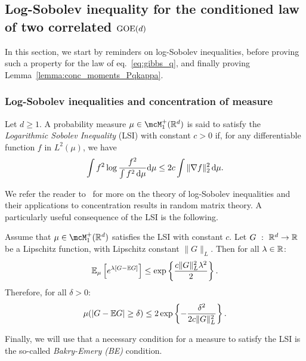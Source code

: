 \subsection{Log-Sobolev inequality for the conditioned law of two correlated \texorpdfstring{$\mathrm{GOE}(d)$}{}}
\label{subsec:lsi}

In this section, we start by reminders on log-Sobolev inequalities, before proving such a property 
for the law of eq.~\eqref{eq:gibbs_q}, and finally proving Lemma~\ref{lemma:conc_moments_Pqkappa}.

\subsubsection{Log-Sobolev inequalities and concentration of measure}\label{subsubsec:lsi}

\begin{definition}\label{def:lsi}
    Let $d \geq 1$.
    A probability measure $\mu \in \mcM_1^+(\bbR^d)$ is said to satisfy the \emph{Logarithmic Sobolev Inequality} (LSI) with constant $c > 0$ if, for any differentiable function 
    $f$ in $L^2(\mu)$, we have 
    \begin{equation}
        \label{eq:lsi}
        \int f^2 \log \frac{f^2}{\int f^2 \, \mathrm{d} \mu} \mathrm{d} \mu \leq 2 c \int \|\nabla f\|_2^2 \, \mathrm{d} \mu.
    \end{equation}
\end{definition}
\noindent
We refer the reader to~\cite{guionnet2009large,anderson2010introduction}
for more on the theory of log-Sobolev inequalities and their applications to concentration results in random matrix theory.
A particularly useful consequence of the LSI is the following. 
\begin{lemma}[Herbst]\label{lemma:herbst}
   Assume that $\mu \in \mcM_1^+(\bbR^d)$ satisfies the LSI with constant $c$. Let $G~:~\mathbb{R}^d \to \mathbb{R}$ be a Lipschitz function, with Lipschitz constant $\|G\|_L$. 
   Then for all $\lambda \in \mathbb{R}$: 
   \begin{align*}
    \mathbb{E}_\mu \left[e^{\lambda[G - \mathbb{E} G]}\right] \leq \exp\left\{\frac{c \|G\|_L^2\lambda^2}{2}\right\}.
   \end{align*}
   Therefore, for all 
   $\delta > 0$: 
   \begin{equation*}
    \mu(|G - \mathbb{E} G| \geq \delta) \leq 2 \exp\left\{-\frac{\delta^2}{2 c \|G\|_L^2}\right\}.
   \end{equation*}
\end{lemma}
\noindent
Finally, we will use that a necessary condition for a measure to satisfy the LSI is the so-called \emph{Bakry-Emery (BE)} condition.
